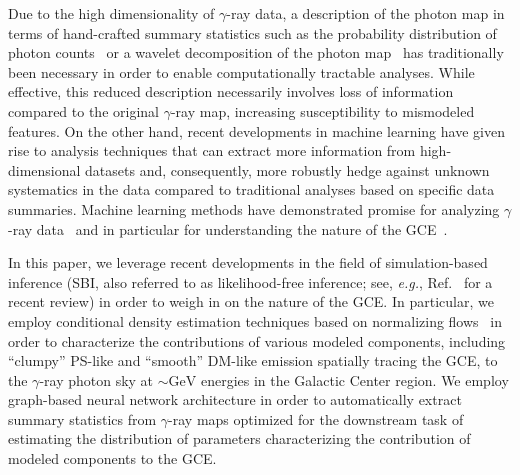 \documentclass[prd,aps,10pt,nofootinbib,twocolumn,superscriptaddress,preprintnumbers,balancelastpage,longbibliography]{revtex4-1}
\begin{document}
 Due to the high dimensionality of $\gamma$-ray data, a description of the photon map in terms of hand-crafted summary statistics such as the probability distribution of photon counts~\cite{Lee:2014mza,Lee:2015fea} or a wavelet decomposition of the photon map~\cite{Bartels:2015aea,Balaji:2018rwz,McDermott:2015ydv} has traditionally been necessary in order to enable computationally tractable analyses. While effective, this reduced description necessarily involves loss of information compared to the original $\gamma$-ray map, increasing susceptibility to mismodeled features. On the other hand, recent developments in machine learning have given rise to analysis techniques that can extract more information from high-dimensional datasets and, consequently, more robustly hedge against unknown systematics in the data compared to traditional analyses based on specific data summaries. Machine learning methods have demonstrated promise for analyzing $\gamma$-ray data~\cite{Caron:2021map} and in particular for understanding the nature of the \Fermi GCE~\cite{List:2020mzd,Caron:2017udl}. 
 
 In this paper, we leverage recent developments in the field of simulation-based inference (SBI, also referred to as likelihood-free inference; see, \emph{e.g.}, Ref.~\cite{cranmer2020frontier} for a recent review)
in order to weigh in on the nature of the GCE. In particular, we employ conditional density estimation techniques based on normalizing flows~\cite{papamakarios2019normalizing,rezende2015variational} in order to characterize the contributions of various modeled components, including ``clumpy'' PS-like and ``smooth'' DM-like emission spatially tracing the GCE, to the $\gamma$-ray photon sky at $\sim\mathrm{GeV}$ energies in the Galactic Center region. We employ graph-based neural network architecture in order to automatically extract summary statistics from $\gamma$-ray maps optimized for the downstream task of estimating the distribution of parameters characterizing the contribution of modeled components to the GCE.
\end{document}
